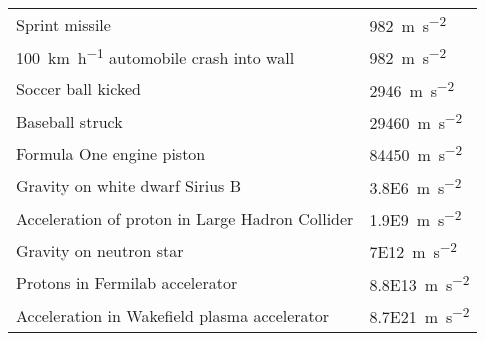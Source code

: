 \documentclass{article}
\begin{document}
\begin{table}[H]
\begin{tabularx}{\textwidth}{ X X }
		Sprint missile & \SI{982}{\meter\per\square\second} \\
		\SI{100}{\kilo\meter\per\hour} automobile crash into wall & \SI{982}{\meter\per\square\second} \\
		Soccer ball kicked & \SI{2946}{\meter\per\square\second} \\
		Baseball struck & \SI{29460}{\meter\per\square\second} \\
		Formula One engine piston & \SI{84450}{\meter\per\square\second} \\
		Gravity on white dwarf Sirius B & \SI{3.8E6}{\meter\per\square\second} \\
		Acceleration of proton in Large Hadron Collider & \SI{1.9E9}{\meter\per\square\second} \\
		Gravity on neutron star & \SI{7E12}{\meter\per\square\second} \\
		Protons in Fermilab accelerator & \SI{8.8E13}{\meter\per\square\second} \\
		Acceleration in Wakefield plasma accelerator & \SI{8.7E21}{\meter\per\square\second} \\
	\end{tabularx}
\end{table}
\end{document}
